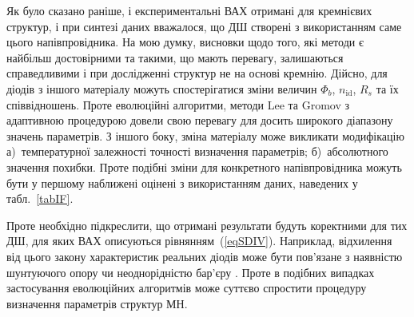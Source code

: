 Як було сказано раніше, і експериментальні ВАХ отримані для кремнієвих структур, і при синтезі даних вважалося, що ДШ створені з використанням саме цього напівпровідника.
На мою думку, висновки щодо того, які методи є найбільш достовірними та такими, що мають перевагу, залишаються справедливими і при дослідженні структур не на основі кремнію.
Дійсно, для діодів з іншого матеріалу можуть спостерігатися зміни  величин $\Phi_b$, $n_\mathrm{id}$, $R_s$ та їх співвідношень.
Проте еволюційні алгоритми, методи Lee та Gromov з адаптивною процедурою довели свою перевагу для досить широкого діапазону значень параметрів.
З іншого боку, зміна матеріалу може викликати модифікацію
а)~температурної залежності точності визначення параметрів;
б)~абсолютного значення похибки.
Проте подібні зміни для конкретного напівпровідника можуть бути у першому наближені оцінені з використанням даних, наведених у табл.~\ref{tabIF}.

Проте необхідно підкреслити, що отримані результати будуть коректними для тих ДШ, для яких ВАХ описуються рівнянням~(\ref{eqSDIV}).
Наприклад, відхилення від цього закону характеристик реальних діодів може бути пов'язане з наявністю шунтуючого опору чи неоднорідністю бар'єру \cite{Tung:MSE,OlikhJAP}.
Проте в подібних випадках застосування еволюційних алгоритмів може суттєво спростити процедуру визначення параметрів структур МН.


